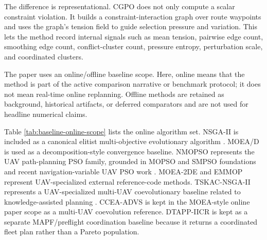 \documentclass[a4paper,fleqn]{cas-dc}
\begin{document}
The difference is representational. CGPO does not only compute a scalar constraint violation. It builds a constraint-interaction graph over route waypoints and uses the graph's tension field to guide selection pressure and variation. This lets the method record internal signals such as mean tension, pairwise edge count, smoothing edge count, conflict-cluster count, pressure entropy, perturbation scale, and coordinated clusters.

The paper uses an online/offline baseline scope. Here, online means that the method is part of the active comparison narrative or benchmark protocol; it does not mean real-time online replanning. Offline methods are retained as background, historical artifacts, or deferred comparators and are not used for headline numerical claims.

Table \ref{tab:baseline-online-scope} lists the online algorithm set. NSGA-II is included as a canonical elitist multi-objective evolutionary algorithm \cite{deb2002nsga2}. MOEA/D is used as a decomposition-style convergence baseline. NMOPSO represents the UAV path-planning PSO family, grounded in MOPSO and SMPSO foundations \cite{coello2002mopso,nebro2009smpso} and recent navigation-variable UAV PSO work \cite{duong2025nmopso_uav}. MOEA-2DE and EMMOP represent UAV-specialized external reference-code methods. TSKAC-NSGA-II represents a UAV-specialized multi-UAV coevolutionary baseline related to knowledge-assisted planning \cite{zhou2024tskac}. CCEA-ADVS is kept in the MOEA-style online paper scope as a multi-UAV coevolution reference. DTAPP-IICR is kept as a separate MAPF/preflight coordination baseline because it returns a coordinated fleet plan rather than a Pareto population.
\end{document}
